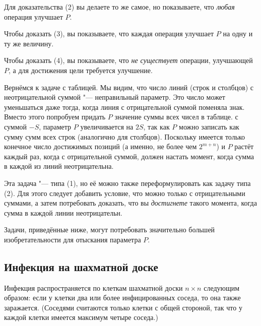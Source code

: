 \documentclass[twoside]{book}
\makeatletter
\newcommand{\rindex}[2][\imki@jobname]{%
  \index[#1]{\detokenize{#2}}%
}
\makeatother
\begin{document}
Для доказательства  (2) вы делаете то же самое, но показываете, что \emph{любая} операция улучшает $P$.

Чтобы доказать  (3), вы показываете, что каждая операция улучшает $P$ на одну и ту же величину.

Чтобы доказать  (4), вы показываете, что \emph{не существует} операции, улучшающей $P$, а для достижения цели требуется улучшение.

\medskip

Вернёмся к задаче с таблицей.
Мы видим, что число линий (строк и столбцов) с неотрицательной суммой "--- неправильный параметр.
Это число может уменьшаться даже тогда, когда линия с отрицательной суммой поменяла знак.
Вместо этого попробуем придать  $P$ значение суммы всех чисел в таблице.
 с суммой $-S$,  параметр $P$ увеличивается на $2S$, так как $P$ можно записать как сумму сумм всех строк (аналогично для столбцов).
Поскольку имеется только конечное число достижимых позиций
(а именно, не более чем $2^{m+n}$) и $P$ растёт каждый раз, когда  с отрицательной суммой,  должен настать момент, когда сумма в каждой из линий  неотрицательна.

Эта задача "--- типа (1), но её можно также переформулировать как задачу типа (2).
Для этого следует добавить условие, что можно  только  с отрицательными суммами, а затем потребовать доказать, что вы \emph{достигнете} такого момента, когда сумма в каждой линии  неотрицательн.

\medskip

{
\sloppy

Задачи, приведённые ниже, могут потребовать значительно большей изобретательности для отыскания параметра $P$.

}

\subsection*{Инфекция на шахматной доске}%
\rindex{Инфекция на шахматной доске}

Инфекция распространяется по клеткам шахматной доски $n \times n$ следующим образом: если у клетки два или более инфицированных соседа, то она также заражается.
(Соседями считаются только клетки с общей стороной, так что у каждой клетки имеется максимум четыре соседа.)
\end{document}
